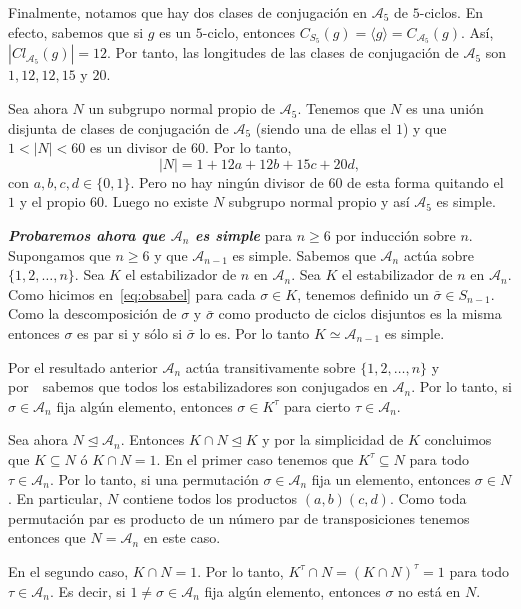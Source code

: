 \documentclass[12pt]{article}
\begin{document}
Finalmente, notamos que hay dos clases de conjugación en $\mathcal{A}_{5}$ de $5$-ciclos. En efecto, sabemos que si $g$ es un $5$-ciclo, entonces $C_{S_{5}}(g) = \langle g \rangle = C_{\mathcal{A}_{5}}(g)$. Así, $|Cl_{\mathcal{A}_{5}}(g)| = 12$. Por tanto, las longitudes de las clases de conjugación de $\mathcal{A}_{5}$ son $1,12,12,15$ y $20$.

Sea ahora $N$ un subgrupo normal propio de $\mathcal{A}_{5}$. Tenemos que $N$ es una unión disjunta de clases de conjugación de $\mathcal{A}_{5}$ (siendo una de ellas el $1$) y que $1 < |N| < 60$ es un divisor de $60$. Por lo tanto, $$|N| = 1 + 12a + 12b + 15c + 20d,$$ con $a,b,c,d \in \lbrace 0, 1 \rbrace$. Pero no hay ningún divisor de $60$ de esta forma quitando el $1$ y el propio $60$. Luego no existe $N$ subgrupo normal propio y así $\mathcal{A}_{5}$ es simple.

\textbf{\textit{Probaremos ahora que $\mathcal{A}_{n}$ es simple}} para $n \geq 6$ por inducción sobre $n$. Supongamos que $n \geq 6$ y que $\mathcal{A}_{n-1}$ es simple. Sabemos que $\mathcal{A}_{n}$ actúa sobre $\lbrace 1,2, \ldots, n \rbrace$. Sea $K$ el estabilizador de $n$ en $\mathcal{A}_{n}$. Sea $K$ el estabilizador de $n$ en $\mathcal{A}_{n}$. Como hicimos en~\ref{eq:obsabel} para cada $\sigma \in K$, tenemos definido un $\bar{\sigma} \in S_{n-1}$. Como la descomposición de $\sigma$ y $\bar{\sigma}$ como producto de ciclos disjuntos es la misma entonces $\sigma$ es par si y sólo si $\bar{\sigma}$ lo es. Por lo tanto $K \simeq \mathcal{A}_{n-1}$ es simple.

Por el resultado anterior $\mathcal{A}_{n}$ actúa transitivamente sobre $\lbrace 1, 2, \ldots, n \rbrace$ y por~~sabemos que todos los estabilizadores son conjugados en $\mathcal{A}_{n}$. Por lo tanto, si $\sigma \in \mathcal{A}_{n}$ fija algún elemento, entonces $\sigma \in K^{\tau}$ para cierto $\tau \in \mathcal{A}_{n}$.

Sea ahora $N\unlhd \mathcal{A}_{n}$. Entonces $K \cap N \unlhd K$ y por la simplicidad de $K$ concluimos que $K \subseteq N$ ó $K \cap N = 1$. En el primer caso tenemos que $K^{\tau} \subseteq N$ para todo $\tau \in \mathcal{A}_{n}$. Por lo tanto, si una permutación $\sigma \in \mathcal{A}_{n}$ fija un elemento, entonces $\sigma \in N$. En particular, $N$ contiene todos los productos $(a,b)(c,d)$. Como toda permutación par es producto de un número par de transposiciones tenemos entonces que $N = \mathcal{A}_{n}$ en este caso.

En el segundo caso, $K \cap N = 1$. Por lo tanto, $K^{\tau} \cap N = (K \cap N)^{\tau} = 1$ para todo $\tau \in \mathcal{A}_{n}$. Es decir, si $1 \neq \sigma \in \mathcal{A}_{n}$ fija algún elemento, entonces $\sigma$ no está en $N$. 
\end{document}
